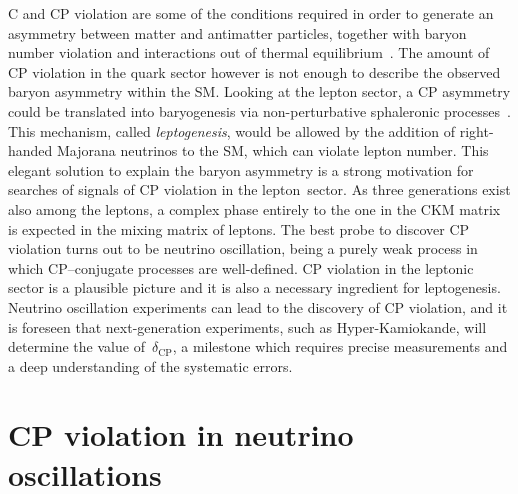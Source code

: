 C and CP violation are some of the conditions required in order to generate %
an asymmetry between matter and antimatter particles, together with %
baryon number violation and interactions out of thermal equilibrium~\cite{Sakharov:1967dj}.
The amount of CP violation in the quark sector however is not enough %
to describe the observed baryon asymmetry within the SM.
Looking at the lepton sector, a CP asymmetry could be translated into baryogenesis %
via non-perturbative sphaleronic processes~\cite{Fukugita:1986hr}.
This mechanism, called \emph{leptogenesis}, would be allowed by the addition of %
right-handed Majorana neutrinos to the SM, which can violate lepton number.
This elegant solution to explain the baryon asymmetry is a strong motivation %
for searches of signals of CP violation in the lepton~sector.
As three generations exist also among the leptons, %
a complex phase entirely to the one in the CKM matrix is expected in the mixing matrix of leptons.
The best probe to discover CP violation turns out to be neutrino oscillation, being a purely weak process in which %
CP--conjugate processes are well-defined.
CP violation in the leptonic sector is a plausible picture and it is also a necessary ingredient for leptogenesis.
Neutrino oscillation experiments can lead to the discovery of CP violation, and it is %
foreseen that next-generation experiments, such as Hyper-Kamiokande, will determine the value of~$\delta_\text{CP}$, %
a milestone which requires precise measurements and a deep understanding of the systematic errors.


\section{CP violation in neutrino oscillations}
\label{sec:cp_oscillation}

